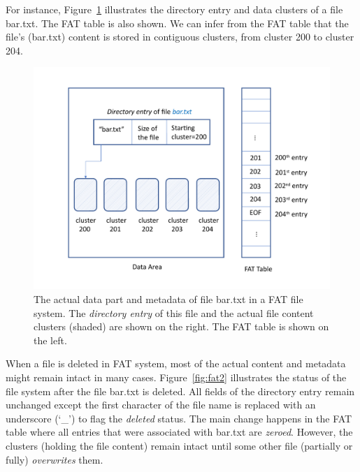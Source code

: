 For instance, Figure~\ref{fig:fat1} illustrates the directory entry and data clusters of 
a file bar.txt. The FAT table is also shown. We can infer from the FAT table that the file's
(bar.txt) content is stored in contiguous clusters, from cluster 200 to cluster 204.


\begin{figure}[h]
     \centering
     \includegraphics[width=\linewidth]{fig/fat1.pdf}
     \caption{The actual data part and metadata of file bar.txt in a FAT file system. The \emph{directory entry} of this file and the actual file content clusters (shaded) are shown on the right. The FAT table is shown on the left.}
     \label{fig:fat1}
 \end{figure}

When a file is deleted in FAT system, most of the actual content and metadata might 
remain intact in many cases. 
Figure~\ref{fig:fat2} illustrates the status of the file system after the file bar.txt is deleted.
All fields of the directory entry remain unchanged except the first character of the file name 
is replaced with an underscore (`\_') to flag the \emph{deleted} status. The main change happens in the FAT table where all entries
that were associated with bar.txt are \emph{zeroed}. However, the clusters (holding the file content) 
remain intact until some other file (partially or fully) \emph{overwrites} them. 

